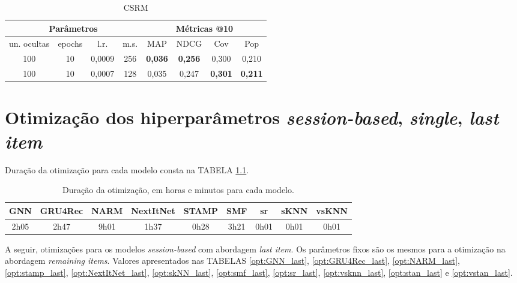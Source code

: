 \begin{table}[htbp]
  \centering
  \begin{tabular}{|c|c|c|c|c|c|c|c|}
    \hline
      \multicolumn{4}{|c|}{Parâmetros} & \multicolumn{4}{c|}{Métricas @10} \\
      \hline
      un. ocultas & epochs & l.r. & m.s. & MAP & NDCG & Cov & Pop \\
      \hline
      100 & 10 & 0,0009 & 256 & \textbf{0,036} & \textbf{0,256} & 0,300 & 0,210 \\
      \hline
      100 & 10 & 0,0007 & 128 & 0,035 & 0,247 & \textbf{0,301} & \textbf{0,211} \\
      \hline
     \end{tabular}
      \caption{CSRM}
      \label{opt:csrm_rem}
\end{table}

\chapter{Otimização dos hiperparâmetros \textit{session-based}, \textit{single}, \textit{last item}}
Duração da otimização para cada modelo consta na TABELA \ref{tab:duration_opt_last}.


\begin{table}[htbp]
  \centering
  \begin{tabular}{|c|c|c|c|c|c|c|c|c|}
      \hline
      GNN & GRU4Rec & NARM & NextItNet & STAMP & SMF & sr & sKNN & vsKNN \\
      \hline
      2h05 & 2h47 & 9h01 & 1h37 & 0h28 &  3h21 & 0h01 & 0h01 & 0h01 \\
      \hline
      \end{tabular}
      \caption{Duração da otimização, em horas e minutos para cada modelo.}
      \label{tab:duration_opt_last}
\end{table}

A seguir, otimizações para os modelos \textit{session-based} com abordagem
\textit{last item}. Os parâmetros fixos são os mesmos para a otimização na
abordagem \textit{remaining items}. Valores apresentados nas TABELAS
\ref{opt:GNN_last}, \ref{opt:GRU4Rec_last}, \ref{opt:NARM_last},
\ref{opt:stamp_last}, \ref{opt:NextItNet_last}, \ref{opt:skNN_last},
\ref{opt:smf_last}, \ref{opt:sr_last}, \ref{opt:vsknn_last},
\ref{opt:stan_last} e \ref{opt:vstan_last}.

